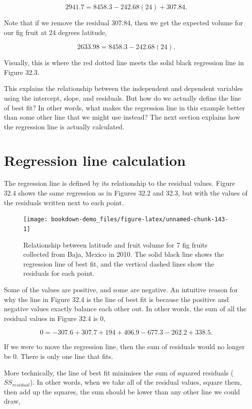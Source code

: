 \documentclass[
  openany]{scrbook}
\begin{document}
\[2941.7 = 8458.3 - 242.68(24) + 307.84.\]

Note that if we remove the residual 307.84, then we get the expected volume for our fig fruit at 24 degrees latitude,

\[2633.98 = 8458.3 - 242.68(24).\]

Visually, this is where the red dotted line meets the solid black regression line in Figure 32.3.

This explains the relationship between the independent and dependent variables using the intercept, slope, and residuals.
But how do we actually define the line of best fit?
In other words, what makes the regression line in this example better than some other line that we might use instead?
The next section explains how the regression line is actually calculated.

\hypertarget{regression-line-calculation}{%
\section{Regression line calculation}\label{regression-line-calculation}}

The regression line is defined by its relationship to the residual values.
Figure 32.4 shows the same regression as in Figures 32.2 and 32.3, but with the values of the residuals written next to each point.

\begin{figure}
\texttt{[image: bookdown-demo\_files/figure-latex/unnamed-chunk-143-1]} \caption{Relationship between latitude and fruit volume for 7 fig fruits collected from Baja, Mexico in 2010. The solid black line shows the regression line of best fit, and the vertical dashed lines show the residuals for each point.}\label{fig:unnamed-chunk-143}
\end{figure}

Some of the values are positive, and some are negative.
An intuitive reason for why the line in Figure 32.4 is the line of best fit is because the positive and negative values exactly balance each other out.
In other words, the sum of all the residual values in Figure 32.4 is 0,

\[0 = -307.6 + 307.7 + 194 + 406.9 - 677.3 - 262.2 + 338.5.\]

If we were to move the regression line, then the sum of residuals would no longer be 0.
There is only one line that fits.

More technically, the line of best fit minimises the sum of squared residuals (\(SS_{residual}\)).
In other words, when we take all of the residual values, square them, then add up the squares, the sum should be lower than any other line we could draw,
\end{document}

